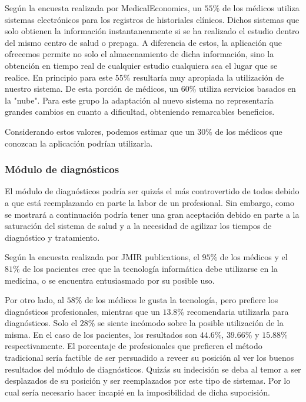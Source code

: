 \documentclass[a4paper,10pt]{article}
\begin{document}
Según la encuesta realizada por MedicalEconomics, un $55\%$ de los médicos utiliza sistemas electrónicos para los registros de historiales clínicos. Dichos sistemas que solo obtienen la información instantaneamente si se ha realizado el estudio dentro del mismo centro de salud o prepaga. A diferencia de estos, la aplicación que ofrecemos permite no solo el almacenamiento de dicha información, sino la obtención  en tiempo real de cualquier estudio cualquiera sea el lugar que se realice. En principio para este $55\%$ resultaría muy apropiada la utilización de nuestro sistema. De esta porción de médicos, un $60\%$ utiliza servicios basados en la "nube". Para este grupo la adaptación al nuevo sistema no representaría grandes cambios en cuanto a dificultad, obteniendo remarcables beneficios.

Considerando estos valores, podemos estimar que un $30\%$ de los médicos que conozcan la aplicación podrían utilizarla. 

\subsubsection{Módulo de diagnósticos}

El módulo de diagnósticos podría ser quizás el más controvertido de todos debido a que está reemplazando en parte la labor de un profesional. Sin embargo, como se mostrará a continuación podría tener una gran aceptación debido en parte a la saturación del sistema de salud y a la necesidad de agilizar los tiempos de diagnóstico y tratamiento.

Según la encuesta realizada por JMIR publications, el $95\%$ de los médicos y el  $81\%$ de los pacientes cree que la tecnología informática debe utilizarse en la medicina, o se encuentra entusiasmado por su posible uso.

Por otro lado, al $58\%$ de los médicos le gusta la tecnología, pero prefiere los diagnósticos profesionales, mientras que un $13.8\%$ recomendaria utilizarla para diagnósticos. Solo el $28\%$ se siente incómodo sobre la posible utilización de la misma. En el caso de los pacientes, los resultados son $44.6\%$, $39.66\%$ y $15.88\%$ respectivamente. El porcentaje de profesionales que prefieren el método tradicional sería factible de ser persuadido a reveer su posición al ver los buenos resultados del módulo de diagnósticos. Quizás su indecisión se deba al temor a ser desplazados de su posición y ser reemplazados por este tipo de sistemas. Por lo cual sería necesario hacer incapié en la imposibilidad de dicha supocisión.
\end{document}
